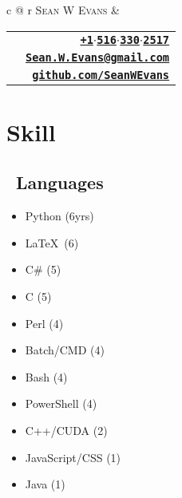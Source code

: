 \documentclass[a3paper]{article}
\begin{document}
\begin{table}[]
	\begin{tabular*}{\textwidth}{c @{\extracolsep{\fill}} r}
		{\Huge \textsc{Sean W Evans}} &
		\begin{tabular}[r]{lr} 
			\href{tel:15163302517}{\faPhone} & 
			\href{tel:15163302517}{\textbf{\texttt{+1$\cdot$516$\cdot$330$\cdot$2517}}} \\ 
			\href{mailto:Sean.W.Evans@gmail.com}{\faEnvelope} & 
			\href{mailto:Sean.W.Evans@gmail.com}{\textbf{\texttt{\color{blue}\underline {Sean.W.Evans@gmail.com}}}} \\ 			
			\href{http://github.com/SeanWEvans}{\faGithub} & \href{http://github.com/SeanWEvans}{\textbf{\texttt{\color{blue}\underline{github.com/SeanWEvans}}}}
		\end{tabular} 
	\end{tabular*}
\end{table}

\section{Skill}
\subsection*{\faCodeFork \ Languages} \vspace{-1em}
\begin{multicols}{4}
\small \begin{itemize} 
    \item[\faDiamond] Python (6yrs)
    \item[\faSuperscript] \LaTeX\ (6)    
    \item[\faFighterJet] C\# (5)
    \item[\faCopyright] C (5)
    \item[\faAmbulance] Perl (4)
    \item[\faTerminal] Batch/CMD (4)
    \item[\faTerminal] Bash (4)
    \item[\faTerminal] PowerShell (4)
    \item[\faCreativeCommons] C++/CUDA (2)
    \item[\faJsfiddle] JavaScript/CSS (1)
    \item[\faCoffee ] Java (1)
\end{itemize}
\end{multicols}
\end{document}
